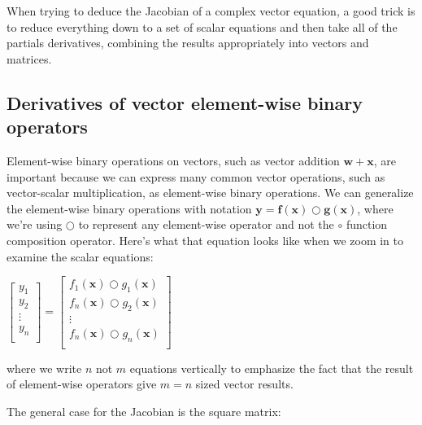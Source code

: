 \documentclass[11pt]{article}
\begin{document}
When trying to deduce the Jacobian of a complex vector equation, a good trick is to reduce everything down to a set of scalar equations and then take all of the partials derivatives, combining the results appropriately into vectors and matrices.

\subsection{Derivatives of vector element-wise binary operators}

Element-wise binary operations on vectors, such as vector addition $\mathbf{w} + \mathbf{x}$, are important because we can express many common vector operations, such as vector-scalar multiplication, as element-wise binary operations.  We can generalize the element-wise binary operations with notation $\mathbf{y} = \mathbf{f(x)} \bigcirc \mathbf{g(x)}$, where we're using $\bigcirc$ to represent any element-wise operator and not the $\circ$ function composition operator.  Here's what that equation looks like when we zoom in to examine the scalar equations:

$\begin{bmatrix}
           y_1\\
           y_2\\
           \vdots \\
           y_n\\
           \end{bmatrix} = \begin{bmatrix}
           f_{1}(\mathbf{x}) \bigcirc g_{1}(\mathbf{x})\\
           f_{n}(\mathbf{x}) \bigcirc g_{2}(\mathbf{x})\\
           \vdots \\
           f_{n}(\mathbf{x}) \bigcirc g_{n}(\mathbf{x})\\
         \end{bmatrix}$

where we write $n$ not $m$ equations vertically to emphasize the fact that the result of element-wise operators give $m=n$ sized vector results.

The general case for the Jacobian is the square matrix:
\end{document}
